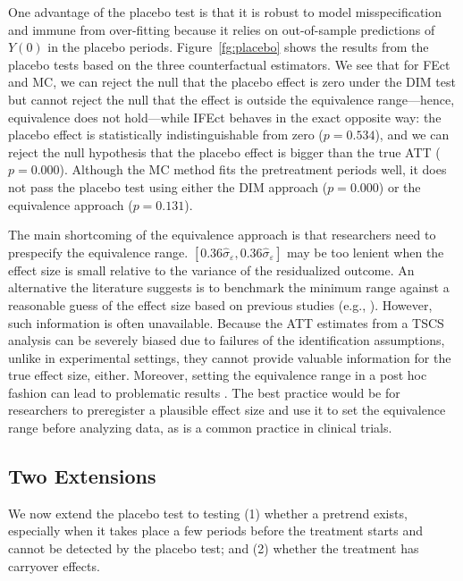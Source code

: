 \documentclass[12pt]{article}
\begin{document}
One advantage of the placebo test is that it is robust to model misspecification and immune from over-fitting because it relies on out-of-sample predictions of $Y(0)$ in the placebo periods. Figure~\ref{fg:placebo} shows the results from the placebo tests based on the three counterfactual estimators. We see that for FEct and MC, we can reject the null that the placebo effect is zero under the DIM test but cannot reject the null that the effect is outside the equivalence range---hence, equivalence does not hold---while IFEct behaves in the exact opposite way: the placebo effect is statistically indistinguishable from zero ($p = 0.534$), and we can reject the null hypothesis that the placebo effect is bigger than the true ATT ($p = 0.000$). Although the MC method fits the pretreatment periods well, it does not pass the placebo test using either the DIM approach ($p = 0.000$) or the equivalence approach ($p = 0.131$). 

The main shortcoming of the equivalence approach is that researchers need to prespecify the equivalence range. $[0.36\hat{\sigma}_{\varepsilon}, 0.36\hat{\sigma}_{\varepsilon}]$ may be too lenient when the effect size is small relative to the variance of the residualized outcome. An alternative the literature suggests is to benchmark the minimum range against a reasonable guess of the effect size based on previous studies (e.g., \citealt{weiens2001}). However, such information is often unavailable. Because the ATT estimates from a TSCS analysis can be severely biased due to failures of the identification assumptions, unlike in experimental settings, they cannot provide valuable information for the true effect size, either. Moreover, setting the equivalence range in a post hoc fashion can lead to problematic results \citep{campbell2018}.  The best practice would be for researchers to preregister a plausible effect size and use it to set the equivalence range before analyzing data, as is a common practice in clinical trials. 

\subsection{Two Extensions}

We now extend the placebo test to testing (1) whether a pretrend exists, especially when it takes place a few periods before the treatment starts and cannot be detected by the placebo test; and (2) whether the treatment has carryover effects.
\end{document}
